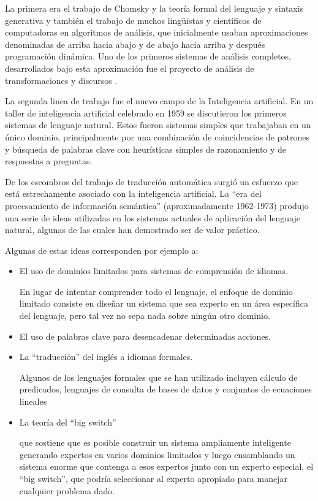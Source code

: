 \documentclass[12pt]{article}
\begin{document}
			La primera era el trabajo de Chomsky y la teoría formal del lenguaje y sintaxis generativa y también el trabajo de muchos lingüistas y científicos de computadoras en algoritmos de análisis, que inicialmente usaban aproximaciones denominadas de  arriba hacia abajo y de abajo hacia arriba y después programación dinámica. Uno de los primeros sistemas de análisis completos, desarrollados bajo esta aproximación fue el proyecto de análisis de transformaciones y discursos .\cite{Kumar2011}
			
			La segunda linea de trabajo fue el nuevo campo de la Inteligencia artificial. En un taller de inteligencia artificial celebrado en 1959 se discutieron los primeros sistemas de lenguaje natural. Estos fueron sistemas simples que trabajaban en un único dominio, principalmente por una combinación de coincidencias de patrones y búsqueda de palabras clave con heurísticas simples de razonamiento y de respuestas a preguntas.\cite{Kumar2011}
			
			De los escombros del trabajo de traducción automática surgió un esfuerzo que está estrechamente asociado con la inteligencia artificial. La ``era del procesamiento de información semántica'' (aproximadamente 1962-1973) produjo una serie de ideas utilizadas en los sistemas actuales de aplicación del lenguaje natural, algunas de las cuales han demostrado ser de valor práctico.\cite{Lehnert2014}
			
			Algunas de estas ideas corresponden por ejemplo a:
			
			\begin{itemize}
				\item El uso de dominios limitados para sistemas de comprensión de idiomas. 
				
				En lugar de intentar comprender todo el lenguaje, el enfoque de dominio limitado consiste en diseñar un sistema que sea experto en un área específica del lenguaje, pero tal vez no sepa nada sobre ningún otro dominio.
							
				\item  El uso de palabras clave para desencadenar determinadas acciones.
				
				\item La ``traducción'' del inglés a idiomas formales. 
				
				Algunos de los lenguajes formales que se han utilizado incluyen cálculo de predicados, lenguajes de consulta de bases de datos y conjuntos de ecuaciones lineales
				
				\item La teoría del ``big switch''
				
				que sostiene que es posible construir un sistema ampliamente inteligente generando expertos en varios dominios limitados y luego ensamblando un sistema enorme que contenga a esos expertos junto con un experto especial, el ``big switch'', que podría seleccionar al experto apropiado para manejar cualquier problema dado.\cite{Lehnert2014}
				
			\end{itemize}
			
\end{document}

